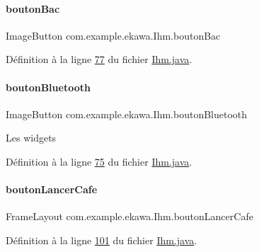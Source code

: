 \paragraph{\texorpdfstring{bouton\+Bac}{boutonBac}}
{\footnotesize\ttfamily Image\+Button com.\+example.\+ekawa.\+Ihm.\+bouton\+Bac\hspace{0.3cm}{\ttfamily [private]}}



Définition à la ligne \hyperlink{_ihm_8java_source_l00077}{77} du fichier \hyperlink{_ihm_8java_source}{Ihm.\+java}.

\mbox{\label{classcom_1_1example_1_1ekawa_1_1_ihm_a0c2ec4e1fa0085520fa9db31ee4284fc}} 
\paragraph{\texorpdfstring{bouton\+Bluetooth}{boutonBluetooth}}
{\footnotesize\ttfamily Image\+Button com.\+example.\+ekawa.\+Ihm.\+bouton\+Bluetooth\hspace{0.3cm}{\ttfamily [private]}}

Les widgets 

Définition à la ligne \hyperlink{_ihm_8java_source_l00075}{75} du fichier \hyperlink{_ihm_8java_source}{Ihm.\+java}.

\mbox{\label{classcom_1_1example_1_1ekawa_1_1_ihm_af64465b03533ddddfaac1a55b0f14012}} 
\paragraph{\texorpdfstring{bouton\+Lancer\+Cafe}{boutonLancerCafe}}
{\footnotesize\ttfamily Frame\+Layout com.\+example.\+ekawa.\+Ihm.\+bouton\+Lancer\+Cafe\hspace{0.3cm}{\ttfamily [private]}}



Définition à la ligne \hyperlink{_ihm_8java_source_l00101}{101} du fichier \hyperlink{_ihm_8java_source}{Ihm.\+java}.

